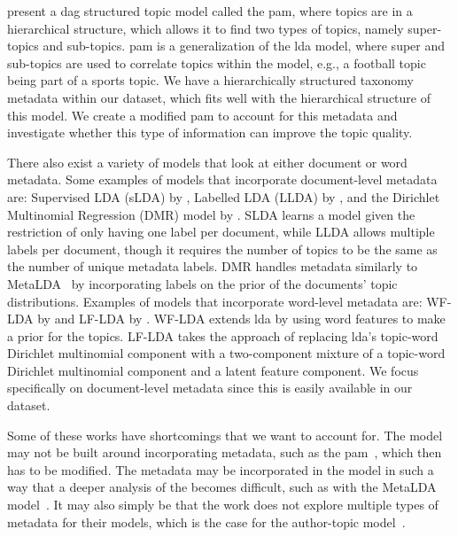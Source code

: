 \citet{li2006pachinko} present a \gls{dag} structured topic model called the \acrfull{pam}, where topics are in a hierarchical structure, which allows it to find two types of topics, namely super-topics and sub-topics. 
\Gls{pam} is a generalization of the \gls{lda} model, where super and sub-topics are used to correlate topics within the model, e.g., a football topic being part of a sports topic.
We have a hierarchically structured taxonomy metadata within our dataset, which fits well with the hierarchical structure of this model.
We create a modified \gls{pam} to account for this metadata and investigate whether this type of information can improve the topic quality.

There also exist a variety of models that look at either document or word metadata.
Some examples of models that incorporate document-level metadata are: Supervised LDA (sLDA) by \citet{blei2010supervised}, Labelled LDA (LLDA) by \citet{llda2009}, and the Dirichlet Multinomial Regression (DMR) model by \citet{mimno2008topic}.
SLDA learns a model given the restriction of only having one label per document, while LLDA allows multiple labels per document, though it requires the number of topics to be the same as the number of unique metadata labels.
DMR handles metadata similarly to MetaLDA~\cite{MetaLDA2017} by incorporating labels on the prior of the documents' topic distributions.
Examples of models that incorporate word-level metadata are: WF-LDA by \citet{wf-lda2010} and LF-LDA by \citet{lf-lda2015}.
WF-LDA extends \gls{lda} by using word features to make a prior for the topics.
LF-LDA takes the approach of replacing \gls{lda}'s topic-word Dirichlet multinomial component with a two-component mixture of a topic-word Dirichlet multinomial component and a latent feature component.
We focus specifically on document-level metadata since this is easily available in our dataset.

Some of these works have shortcomings that we want to account for.
The model may not be built around incorporating metadata, such as the \gls{pam}~\cite{li2006pachinko}, which then has to be modified.
The metadata may be incorporated in the model in such a way that a deeper analysis of the becomes difficult, such as with the MetaLDA model~\cite{MetaLDA2017}.
It may also simply be that the work does not explore multiple types of metadata for their models, which is the case for the author-topic model~\cite{author_topic_2012}.

